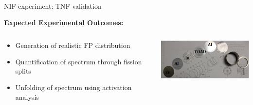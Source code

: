 \documentclass[xcolor=x11names,compress]{beamer}
\renewcommand{\(}{\begin{columns}}
\renewcommand{\)}{\end{columns}}
\newcommand{\<}[1]{\begin{column}{#1}}
\renewcommand{\>}{\end{column}}
\begin{document}
\begin{frame}{NIF experiment: TNF validation}

    \textbf{Expected Experimental Outcomes:}
    
    \vspace*{1em}
      \begin{columns}
        \begin{column}{0.5\linewidth}
          \vspace{-0.15	cm} 
          \begin{itemize}
            \item Generation of realistic FP distribution
            \item Quantification of spectrum through fission splits
            \item Unfolding of spectrum using activation analysis
          \end{itemize}
        \end{column}
        
        \begin{column}{0.5\linewidth}
          \includegraphics[width=2.0in]{../figs/NAS2.png}
        \end{column}
      \end{columns}
\end{frame}
\end{document}
